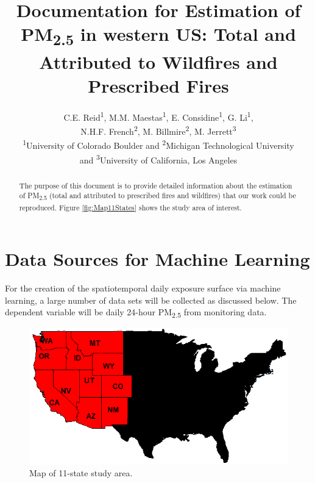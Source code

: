 \documentclass[letterpaper,12pt]{article}
\title{Documentation for Estimation of PM\textsubscript{2.5} in western US: Total and Attributed to Wildfires and Prescribed Fires}
\author{C.E. Reid\textsuperscript{1}, 
M.M. Maestas\textsuperscript{1}, 
E. Considine\textsuperscript{1}, 
G. Li\textsuperscript{1}, \\
N.H.F. French\textsuperscript{2}, 
M. Billmire\textsuperscript{2}, 
M. Jerrett\textsuperscript{3} \\ \textsuperscript{1}University of Colorado Boulder and \textsuperscript{2}Michigan Technological University \\ and \textsuperscript{3}University of California, Los Angeles}
\begin{document}
\selectfont
{}

\maketitle

\begin{abstract}
The purpose of this document is to provide detailed information about the estimation of PM\textsubscript{2.5} (total and attributed to prescribed fires and wildfires) that our work could be reproduced. Figure \ref{fig:Map11States} shows the study area of interest.
\end{abstract}

\tableofcontents



\pagebreak
\section{Data Sources for Machine Learning}
For the creation of the spatiotemporal daily exposure surface via machine learning, a large number of data sets will be collected as discussed below. The dependent variable will be daily 24-hour PM\textsubscript{2.5} from monitoring data.  

\begin{figure}[H] %
\includegraphics[width=1\textwidth]{WesternStatesNoTitleCropped.png} %
\caption{\label{fig:Map11States}Map of 11-state study area.} %
\end{figure} %
\end{document}
